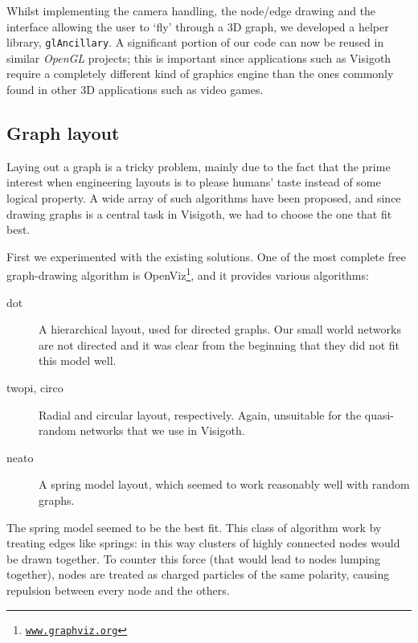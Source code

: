 \documentclass[a4paper,11pt,titlepage]{article}
\let\stdhref\href
\renewcommand{\href}[2]{\stdhref{#1}{\texttt{#2}}}
\newcommand{\code}[1]{\texttt{#1}}
\newcommand{\buzz}[1]{\emph{#1}}
\newcommand{\OpenGL}{\buzz{OpenGL} }
\begin{document}
Whilst implementing the camera handling, the node/edge drawing and the
interface allowing the user to `fly' through a 3D graph, we developed
a helper library, \code{glAncillary}. A significant portion of our
code can now be reused in similar \OpenGL projects; this is important
since applications such as Visigoth require a completely different
kind of graphics engine than the ones commonly found in other 3D
applications such as video games.



\subsection{Graph layout}
Laying out a graph is a tricky problem, mainly due to the fact that the
prime interest when engineering layouts is to please humans' taste
instead of some logical property. A wide array of such algorithms have
been proposed, and since drawing graphs is a central task in Visigoth,
we had to choose the one that fit best.

First we experimented with the existing solutions. One of the most
complete free graph-drawing algorithm is
OpenViz\footnote{\href{http://www.graphviz.org/}{www.graphviz.org}},
and it provides various algorithms:

\begin{description}
\item [dot] A hierarchical layout, used for directed graphs. Our small
  world networks are not directed and it was clear from the beginning
  that they did not fit this model well.

\item [twopi, circo] Radial and circular layout, respectively. Again,
  unsuitable for the quasi-random networks that we use in Visigoth.

\item [neato] A spring model layout, which seemed to work reasonably
  well with random graphs.
\end{description}

The spring model seemed to be the best fit. This class of algorithm
work by treating edges like springs: in this way clusters of highly
connected nodes would be drawn together. To counter this force (that
would lead to nodes lumping together), nodes are treated as charged
particles of the same polarity, causing repulsion between every node
and the others.
\end{document}
